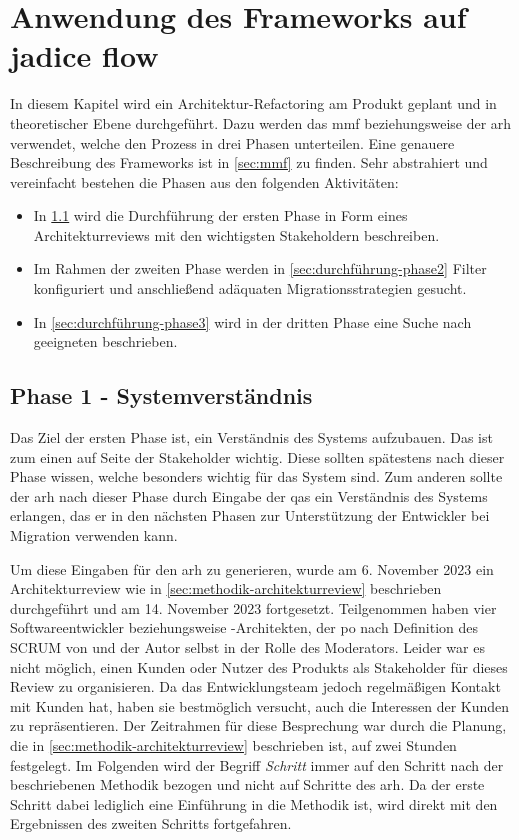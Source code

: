 \chapter{Anwendung des Frameworks auf jadice flow}
\label{chap:anwendung}

In diesem Kapitel wird ein Architektur-Refactoring am Produkt \jf geplant und in theoretischer Ebene durchgeführt.
Dazu werden das \acrfull{mmf} beziehungsweise der \acrfull{arh} verwendet, welche den Prozess in drei Phasen unterteilen.
Eine genauere Beschreibung des Frameworks ist in \cref{sec:mmf} zu finden.
Sehr abstrahiert und vereinfacht bestehen die Phasen aus den folgenden Aktivitäten:
\begin{itemize}
	\item In \cref{sec:durchführung-phase1} wird die Durchführung der ersten Phase in Form eines Architekturreviews mit den wichtigsten Stakeholdern beschreiben.
	\item Im Rahmen der zweiten Phase werden in \cref{sec:durchführung-phase2} Filter konfiguriert und anschließend adäquaten Migrationsstrategien gesucht.
	\item In \cref{sec:durchführung-phase3} wird in der dritten Phase eine Suche nach geeigneten \bpp beschrieben.
\end{itemize}

\section{Phase 1 - Systemverständnis}
\label{sec:durchführung-phase1}

Das Ziel der ersten Phase ist, ein Verständnis des Systems aufzubauen.
Das ist zum einen auf Seite der Stakeholder wichtig.
Diese sollten spätestens nach dieser Phase wissen, welche  besonders wichtig für das System sind.
Zum anderen sollte der \gls{arh} nach dieser Phase durch Eingabe der \glspl{qa} ein Verständnis des Systems erlangen, das er in den nächsten Phasen zur Unterstützung der Entwickler bei Migration verwenden kann.

Um diese Eingaben für den \gls{arh} zu generieren, wurde am 6. November 2023 ein Architekturreview wie in \cref{sec:methodik-architekturreview} beschrieben durchgeführt und am 14. November 2023 fortgesetzt.
Teilgenommen haben vier Softwareentwickler beziehungsweise -Architekten, der \acrlong{po} nach Definition des SCRUM von  und der Autor selbst in der Rolle des Moderators.
Leider war es nicht möglich, einen Kunden oder Nutzer des Produkts als Stakeholder für dieses Review zu organisieren.
Da das Entwicklungsteam jedoch regelmäßigen Kontakt mit Kunden hat, haben sie bestmöglich versucht, auch die Interessen der Kunden zu repräsentieren.
Der Zeitrahmen für diese Besprechung war durch die Planung, die in \cref{sec:methodik-architekturreview} beschrieben ist, auf zwei Stunden festgelegt.
Im Folgenden wird der Begriff \emph{Schritt} immer auf den Schritt nach der beschriebenen Methodik bezogen und nicht auf Schritte des \gls{arh}.
Da der erste Schritt dabei lediglich eine Einführung in die Methodik ist, wird direkt mit den Ergebnissen des zweiten Schritts fortgefahren.

